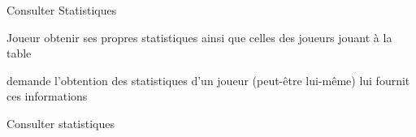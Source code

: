 \begin{usecase}{Consulter Statistiques}
	
	\begin{presentation}
		\actor Joueur
		\goal obtenir ses propres statistiques ainsi que celles des joueurs jouant à la table
		
		\begin{precondition}
			\aucune
		\end{precondition}
		
		\begin{postcondition}
			\aucune
		\end{postcondition}
		
		\begin{includeuc}
			\aucune
		\end{includeuc}
	\end{presentation}
	
	\begin{scenario}
		\start demande l'obtention des statistiques d'un joueur (peut-être lui-même)
			\system lui fournit ces informations
	\end{scenario}
	
	                {Consulter statistiques}
	
\end{usecase}